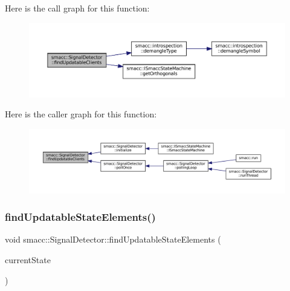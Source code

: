 Here is the call graph for this function\+:
\nopagebreak
\begin{figure}[H]
\begin{center}
\leavevmode
\includegraphics[width=350pt]{classsmacc_1_1SignalDetector_a47ec2df560e2e33758ce3975bece9385_cgraph}
\end{center}
\end{figure}
Here is the caller graph for this function\+:
\nopagebreak
\begin{figure}[H]
\begin{center}
\leavevmode
\includegraphics[width=350pt]{classsmacc_1_1SignalDetector_a47ec2df560e2e33758ce3975bece9385_icgraph}
\end{center}
\end{figure}
\mbox{\label{classsmacc_1_1SignalDetector_a443234ebdf8cedd45cde725e64639dfe}} 
\subsubsection{\texorpdfstring{find\+Updatable\+State\+Elements()}{findUpdatableStateElements()}}
{\footnotesize\ttfamily void smacc\+::\+Signal\+Detector\+::find\+Updatable\+State\+Elements (\begin{DoxyParamCaption}\item[{\hyperlink{classsmacc_1_1ISmaccState}{I\+Smacc\+State} $\ast$}]{current\+State }\end{DoxyParamCaption})\hspace{0.3cm}{\ttfamily [private]}}

